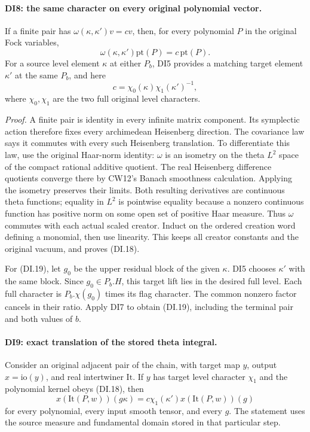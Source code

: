 \paragraph{DI8: the same character on every original polynomial vector.}
\label{claim:DI8}
If a finite pair has \(\omega(\kappa,\kappa')v=cv\), then, for
every polynomial \(P\) in the original Fock variables,
\[
           \omega(\kappa,\kappa')\mathrm{pt}(P)
                      =c\,\mathrm{pt}(P).
 \tag{DI.18}
\]
For a source level element \(\kappa\) at either \(P_b\), DI5
provides a matching target element \(\kappa'\) at the same \(P_b\),
and here
\[
                 c=\chi_0(\kappa)\chi_1(\kappa')^{-1},
 \tag{DI.19}
\]
where \(\chi_0,\chi_1\) are the two full original level characters.

\emph{Proof.}
A finite pair is identity in every infinite matrix component. Its
symplectic action therefore fixes every archimedean Heisenberg
direction. The covariance law says it commutes with every such
Heisenberg translation. To differentiate this law, use the original
Haar-norm identity: \(\omega\) is an isometry on the theta
\(L^2\) space of the compact rational additive quotient. The
real Heisenberg difference quotients converge there by CW12's
Banach smoothness calculation. Applying the isometry preserves their
limits. Both resulting derivatives are continuous theta functions;
equality in \(L^2\) is pointwise equality because a nonzero
continuous function has positive norm on some open set of positive
Haar measure. Thus \(\omega\) commutes with each actual scaled
creator. Induct on the ordered creation word defining a monomial,
then use linearity. This keeps all creator constants and the original
vacuum, and proves (DI.18).

For (DI.19), let \(g_0\) be the upper residual block of the given
\(\kappa\). DI5 chooses \(\kappa'\) with the same block. Since
\(g_0\in P_b.H\), this target lift lies in the desired full level.
Each full character is \(P_b.\chi(g_0)\) times its flag character.
The common nonzero factor cancels in their ratio. Apply DI7 to obtain
(DI.19), including the terminal pair and both values of \(b\).

\paragraph{DI9: exact translation of the stored theta integral.}
\label{claim:DI9}
Consider an original adjacent pair of the chain, with target map
\(y\), output \(x=\mathrm{io}(y)\), and real intertwiner
\(\mathrm{It}\). If \(y\) has target level character \(\chi_1\)
and the polynomial kernel obeys (DI.18), then
\[
 x(\mathrm{It}(P,w))(g\kappa)
    =c\chi_1(\kappa')x(\mathrm{It}(P,w))(g)
 \tag{DI.20}
\]
for every polynomial, every input smooth tensor, and every \(g\).
The statement uses the source measure and fundamental domain stored
in that particular step.

